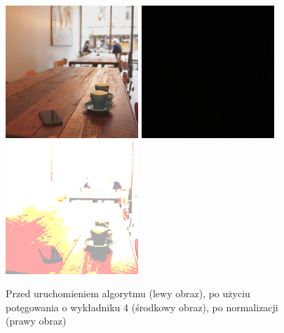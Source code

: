 \documentclass[a4paper,12pt]{book}
\begin{document}
\begin{figure}[H]
	\caption{Przed uruchomieniem algorytmu (lewy obraz), po użyciu potęgowania o wykładniku 4 (środkowy obraz), po normalizacji (prawy obraz)}
	\includegraphics[width=5cm, height=5cm]{coffee-unmodified.jpg}
	\includegraphics[width=5cm, height=5cm]{3-6/root-color-coffee-4.png}
	\includegraphics[width=5cm, height=5cm]{3-6/root-color-coffee-4-norm.png}
\end{figure}
\end{document}
